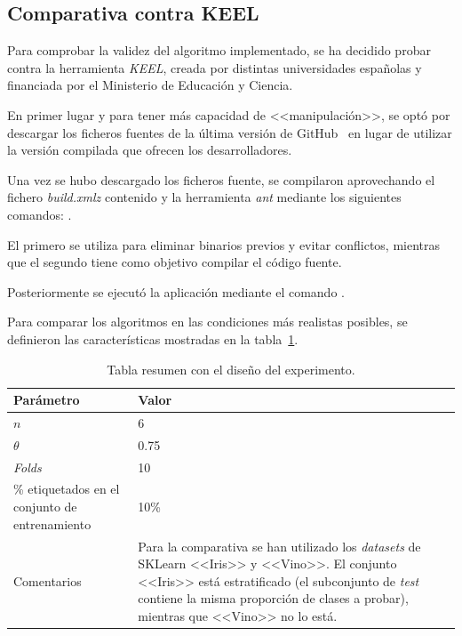 \subsection{Comparativa contra KEEL}

Para comprobar la validez del algoritmo implementado, se ha decidido probar contra la herramienta \textit{KEEL}, creada por distintas universidades españolas y financiada por el Ministerio de Educación y Ciencia.

En primer lugar y para tener más capacidad de <<manipulación>>, se optó por descargar los ficheros fuentes de la última versión de GitHub~\cite{keelRepo} en lugar de utilizar la versión compilada que ofrecen los desarrolladores.

Una vez se hubo descargado los ficheros fuente, se compilaron aprovechando el fichero \textit{build.xmlz} contenido y la herramienta \textit{ant} mediante los siguientes comandos:  .

El primero se utiliza para eliminar binarios previos y evitar conflictos, mientras que el segundo tiene como objetivo compilar el código fuente.

Posteriormente se ejecutó la aplicación mediante el comando .

Para comparar los algoritmos en las condiciones más realistas posibles, se definieron las características mostradas en la tabla~\ref{tabla_coforest_keelvsnuestro_diseño}.

\begin{table}
	\begin{centering}
		\begin{tabular}{@{}p{10em} p{20em} @{}}
			\toprule
			\textbf{Parámetro} & \textbf{Valor} \\ 
			\midrule
			$n$ & 6\\
			$\theta$ & 0.75 \\
			\textit{Folds} & 10 \\
			\% etiquetados en el conjunto de entrenamiento & 10\% \\
			Comentarios & Para la comparativa se han utilizado los \textit{datasets} de SKLearn <<Iris>> y <<Vino>>. El conjunto <<Iris>> está estratificado (el subconjunto de \textit{test} contiene la misma proporción de clases a probar), mientras que <<Vino>> no lo está.
		\end{tabular}
	\end{centering}
	\caption{Tabla resumen con el diseño del experimento.}
	\label{tabla_coforest_keelvsnuestro_diseño}	
\end{table}

